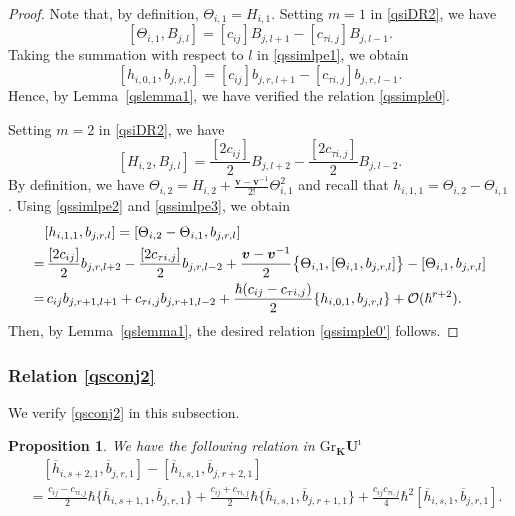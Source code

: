 \documentclass[11pt,reqno]{amsart}
\numberwithin{equation}{section}
\newtheorem{prop}[thm]{Proposition}
\theoremstyle{definition}
\theoremstyle{remark}
\newcommand{\mc}{\mathcal}
\newcommand{\bv}{{\bm{v}}}
\def \h{\hbar}
\def \H{h}
\def \X{b}
\def \Gr{\mathrm{Gr}}
\def \tUi{\mathbf{U}^\imath}
\def \ov{\overline}
\begin{document}
 \begin{proof}
 Note that, by definition, $\Theta_{i,1}=H_{i,1}$. Setting $m=1$ in \eqref{qsiDR2}, we have
\begin{equation}\label{qssimlpe1}
[\Theta_{i,1},B_{j,l}]=[c_{ij}] B_{j,l+1}-[c_{\tau i,j}] B_{j,l-1}.
\end{equation}
Taking the summation with respect to $l$ in \eqref{qssimlpe1}, we obtain
\begin{equation}\label{qssimlpe2}
[\H_{i,0,1},\X_{j,r,l}]=[c_{ij}] \X_{j,r,l+1}-[c_{\tau i,j}]\X_{j,r,l-1}  .
\end{equation}
Hence, by Lemma~\ref{qslemma1}, we have verified the relation \eqref{qssimple0}.

Setting  $m=2$ in \eqref{qsiDR2}, we have
\begin{equation} \label{qssimlpe3}
[H_{i,2},B_{j,l}]=\frac{[2c_{ij}]}{2} B_{j,l+2}-\frac{[2c_{\tau i,j}]}{2} B_{j,l-2}.
\end{equation}
By definition, we have $\Theta_{i,2}=H_{i,2}+\frac{\bv-\bv^{-1}}{2!}\Theta_{i,1}^2$ and recall that $\H_{i,1,1}=\Theta_{i,2}-\Theta_{i,1}$. Using \eqref{qssimlpe2} and \eqref{qssimlpe3}, we obtain
\begin{align*}\notag
& [\H_{i,1,1},\X_{j,r,l}]=[\Theta_{i,2}-\Theta_{i,1},\X_{j,r,l}]
\\\notag
=&\, \frac{[2c_{ij}]}{2} \X_{j,r,l+2}-\frac{[2c_{\tau i,j}]}{2}\X_{j,r,l-2}+\frac{\bv-\bv^{-1}}{2}\big\{\Theta_{i,1},[\Theta_{i,1},\X_{j,r,l}]\big\}-[\Theta_{i,1},\X_{j,r,l}]
\\
=&\, c_{ij}\X_{j,r+1,l+1}+c_{\tau i,j} \X_{j,r+1,l-2}+\frac{\h(c_{ij}-c_{\tau i,j})}{2}\{\H_{i,0,1},\X_{j,r,l}\}+\mc O(\h^{r+2}).%
\end{align*}
Then, by Lemma~\ref{qslemma1}, the desired relation \eqref{qssimple0'} follows.
\end{proof}

\subsubsection{Relation \eqref{qsconj2}} We verify  \eqref{qsconj2} in this subsection.

\begin{prop}
We have the following relation in $\Gr_{\mathbf{K}}\tUi$
\begin{align*}
&\quad [\ov{\H}_{i,s+2,1},\ov{\X}_{j,r,1}] - [\ov{\H}_{i,s,1},\ov{\X}_{j,r+2,1}]
\\
&=\frac{c_{ij}-c_{\tau i,j}}{2}\h\{\ov{\H}_{i,s+1,1},\ov{\X}_{j,r,1}\}+\frac{c_{ij}+c_{\tau i,j}}{2}\h\{\ov{\H}_{i,s,1},\ov{\X}_{j,r+1,1}\}+\frac{c_{ij}c_{\tau i,j}}{4}\h^2[\ov{\H}_{i,s,1}, \ov{\X}_{j,r,1}].
\end{align*}
\end{prop}
\end{document}
